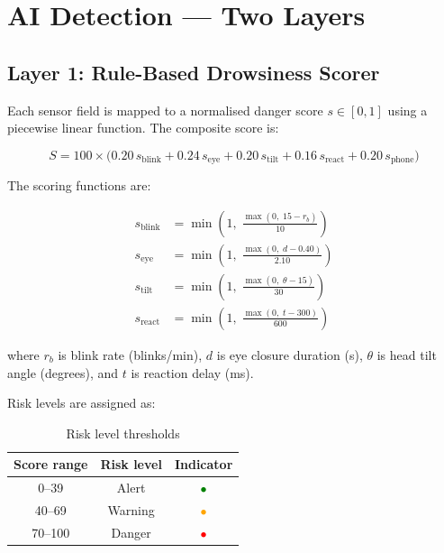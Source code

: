 \documentclass[12pt, a4paper]{article}
\begin{document}
\section{AI Detection — Two Layers}
\label{sec:ai}

\subsection{Layer 1: Rule-Based Drowsiness Scorer}

Each sensor field is mapped to a normalised danger score $s \in [0, 1]$
using a piecewise linear function. The composite score is:

\begin{equation}
    S = 100 \times \bigl(
        0.20\,s_\text{blink}
      + 0.24\,s_\text{eye}
      + 0.20\,s_\text{tilt}
      + 0.16\,s_\text{react}
      + 0.20\,s_\text{phone}
    \bigr)
\end{equation}

The scoring functions are:

\begin{align}
    s_\text{blink}  &= \min\!\left(1,\; \frac{\max(0,\;15 - r_b)}{10}\right) \\
    s_\text{eye}    &= \min\!\left(1,\; \frac{\max(0,\; d - 0.40)}{2.10}\right) \\
    s_\text{tilt}   &= \min\!\left(1,\; \frac{\max(0,\; \theta - 15)}{30}\right) \\
    s_\text{react}  &= \min\!\left(1,\; \frac{\max(0,\; t - 300)}{600}\right)
\end{align}

where $r_b$ is blink rate (blinks/min), $d$ is eye closure duration (s),
$\theta$ is head tilt angle (degrees), and $t$ is reaction delay (ms).

Risk levels are assigned as:

\begin{table}[H]
\centering
\caption{Risk level thresholds}
\begin{tabular}{ccc}
\toprule
\textbf{Score range} & \textbf{Risk level} & \textbf{Indicator} \\
\midrule
0--39  & Alert   & \textcolor{green}{$\bullet$} \\
40--69 & Warning & \textcolor{orange}{$\bullet$} \\
70--100 & Danger & \textcolor{red}{$\bullet$} \\
\bottomrule
\end{tabular}
\end{table}
\end{document}
